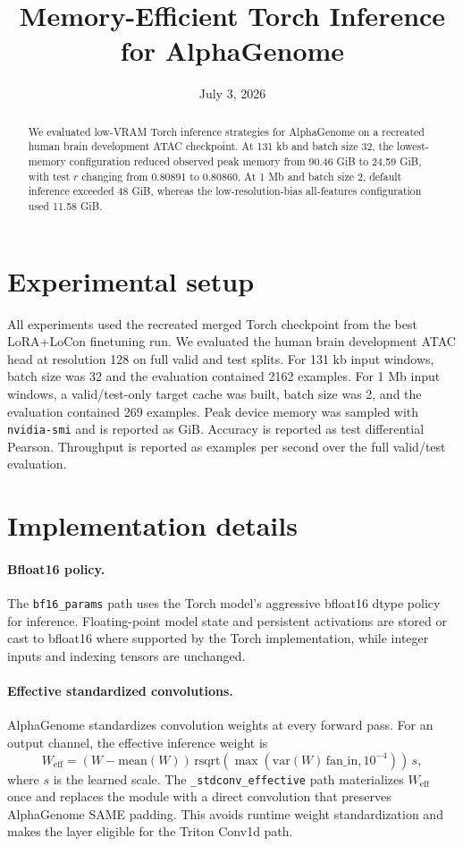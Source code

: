 \documentclass[11pt]{article}
\title{Memory-Efficient Torch Inference for AlphaGenome}
\author{}
\date{July 3, 2026}
\begin{document}
\maketitle

\begin{abstract}
We evaluated low-VRAM Torch inference strategies for AlphaGenome on a recreated
human brain development ATAC checkpoint. At 131 kb and batch size 32, the
lowest-memory configuration reduced observed peak memory from 90.46 GiB to
24.59 GiB, with test \(r\) changing from 0.80891 to 0.80860. At 1 Mb and batch
size 2, default inference exceeded 48 GiB, whereas the low-resolution-bias
all-features configuration used 11.58 GiB.
\end{abstract}

\section{Experimental setup}

All experiments used the recreated merged Torch checkpoint from the best
LoRA+LoCon finetuning run. We evaluated the human brain development ATAC head
at resolution 128 on full valid and test splits. For 131 kb input windows,
batch size was 32 and the evaluation contained 2162 examples. For 1 Mb input
windows, a valid/test-only target cache was built, batch size was 2, and the
evaluation contained 269 examples. Peak device memory was sampled with
\texttt{nvidia-smi} and is reported as GiB. Accuracy is reported as test
differential Pearson. Throughput is reported as examples per second over the
full valid/test evaluation.

\section{Implementation details}

\paragraph{Bfloat16 policy.}
The \texttt{bf16\_params} path uses the Torch model's aggressive bfloat16 dtype
policy for inference. Floating-point model state and persistent activations are
stored or cast to bfloat16 where supported by the Torch implementation, while
integer inputs and indexing tensors are unchanged.

\paragraph{Effective standardized convolutions.}
AlphaGenome standardizes convolution weights at every forward pass. For an
output channel, the effective inference weight is
\[
  W_{\mathrm{eff}} =
  (W - \mathrm{mean}(W))\,
  \mathrm{rsqrt}\left(\max(\mathrm{var}(W)\,\mathrm{fan\_in}, 10^{-4})\right)\,
  s,
\]
where \(s\) is the learned scale. The \texttt{\_stdconv\_effective} path
materializes \(W_{\mathrm{eff}}\) once and replaces the module with a direct
convolution that preserves AlphaGenome SAME padding. This avoids runtime weight
standardization and makes the layer eligible for the Triton Conv1d path.
\end{document}
